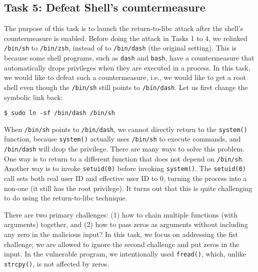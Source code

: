 \subsection{Task 5: Defeat Shell's countermeasure}

The purpose of this task is to launch the return-to-libc attack after 
the shell's countermeasure is enabled. 
Before doing the attack in Tasks 1 to 4, we relinked \texttt{/bin/sh} to \texttt{/bin/zsh},
instead of to \texttt{/bin/dash} (the original setting). This is because some shell programs, such 
as \texttt{dash} and \texttt{bash}, have a countermeasure that automatically 
drops privileges when they are executed in a \setuid process. In this task, we 
would like to defeat such a countermeasure, i.e., we would like to get a root shell even though
the \texttt{/bin/sh} still points to \texttt{/bin/dash}.   
Let us first change the symbolic link back:

\begin{lstlisting}
$ sudo ln -sf /bin/dash /bin/sh
\end{lstlisting}


When \texttt{/bin/sh} points to \texttt{/bin/dash}, we cannot directly return 
to the \texttt{system()} function, because \texttt{system()} actually uses 
\texttt{/bin/sh} to execute commands, and \texttt{/bin/dash} will 
drop the privilege. There are many ways to solve this problem. One way 
is to return to a different function that does not depend on \texttt{/bin/sh}. 
Another way is to invoke \texttt{setuid(0)} before 
invoking \texttt{system()}. The \texttt{setuid(0)} call sets both real user ID and  
effective user ID to 0, turning the process into a non-\setuid one (it still has 
the root privilege). It turns out that this is quite challenging to do 
using the return-to-libc technique. 


There are two primary challenges: (1) how to 
chain multiple functions (with arguments) together, and (2) how to
pass zeros as arguments without including any zero in the malicious 
input? In this task, we focus on addressing the fist challenge; 
we are allowed to ignore the second challenge and 
put zeros in the input.
In the vulnerable program, we 
intentionally used \texttt{fread()}, which, unlike \texttt{strcpy()},
is not affected by zeros. 



